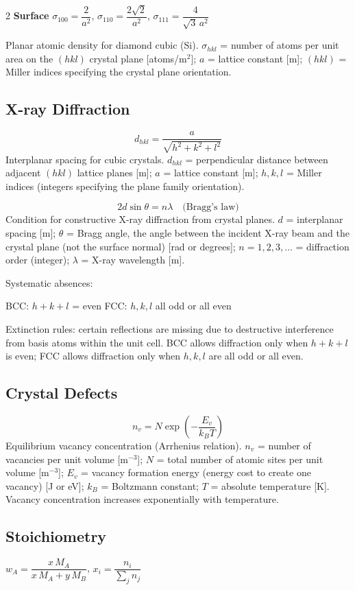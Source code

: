 \documentclass[9pt]{extarticle}
\newcommand{\eqlabel}[1]{\textbf{\scriptsize #1}\;}
\newcommand{\desc}[1]{{\small\color{desc}#1}}
\begin{document}
\begin{multicols}{2}
\eqlabel{Surface} $\sigma_{100} = \dfrac{2}{a^2}$, \; $\sigma_{110} = \dfrac{2\sqrt{2}}{a^2}$, \; $\sigma_{111} = \dfrac{4}{\sqrt{3}\,a^2}$

\desc{Planar atomic density for diamond cubic (Si). $\sigma_{hkl}$ = number of atoms per unit area on the $(hkl)$ crystal plane [atoms/m$^2$]; $a$ = lattice constant [m]; $(hkl)$ = Miller indices specifying the crystal plane orientation.}

\subsection{X-ray Diffraction}
\[d_{hkl} = \frac{a}{\sqrt{h^2+k^2+l^2}}\]
\desc{Interplanar spacing for cubic crystals. $d_{hkl}$ = perpendicular distance between adjacent $(hkl)$ lattice planes [m]; $a$ = lattice constant [m]; $h, k, l$ = Miller indices (integers specifying the plane family orientation).}

\[2d\sin\theta = n\lambda \quad\text{(Bragg's law)}\]
\desc{Condition for constructive X-ray diffraction from crystal planes. $d$ = interplanar spacing [m]; $\theta$ = Bragg angle, the angle between the incident X-ray beam and the crystal plane (not the surface normal) [rad or degrees]; $n = 1, 2, 3, \ldots$ = diffraction order (integer); $\lambda$ = X-ray wavelength [m].}

Systematic absences:

BCC: $h\!+\!k\!+\!l$ = even \quad FCC: $h,k,l$ all odd or all even

\desc{Extinction rules: certain reflections are missing due to destructive interference from basis atoms within the unit cell. BCC allows diffraction only when $h + k + l$ is even; FCC allows diffraction only when $h, k, l$ are all odd or all even.}

\subsection{Crystal Defects}
\[n_v = N\exp\!\left(-\frac{E_v}{k_BT}\right)\]
\desc{Equilibrium vacancy concentration (Arrhenius relation). $n_v$ = number of vacancies per unit volume [m$^{-3}$]; $N$ = total number of atomic sites per unit volume [m$^{-3}$]; $E_v$ = vacancy formation energy (energy cost to create one vacancy) [J or eV]; $k_B$ = Boltzmann constant; $T$ = absolute temperature [K]. Vacancy concentration increases exponentially with temperature.}

\subsection{Stoichiometry}
$w_A = \dfrac{x\,M_A}{x\,M_A + y\,M_B}$, \quad $x_i = \dfrac{n_i}{\sum_j n_j}$


\end{multicols}
\end{document}
